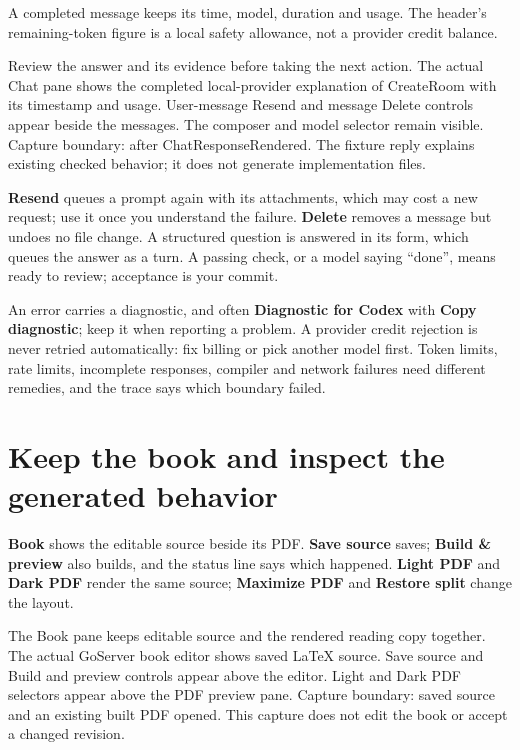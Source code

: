 A completed message keeps its time, model, duration and usage. The header's
remaining-token figure is a local safety allowance, not a provider credit balance.

  {Review the answer and its evidence before taking the next action.}
  {The actual Chat pane shows the completed local-provider explanation of CreateRoom with its timestamp and usage. User-message Resend and message Delete controls appear beside the messages. The composer and model selector remain visible.}
  {Capture boundary: after ChatResponseRendered. The fixture reply explains existing checked behavior; it does not generate implementation files.}

\textbf{Resend} queues a prompt again with its attachments, which may cost a new
request; use it once you understand the failure. \textbf{Delete} removes a message
but undoes no file change. A structured question is answered in its form, which
queues the answer as a turn. A passing check, or a model saying ``done'', means
ready to review; acceptance is your commit.

An error carries a diagnostic, and often \textbf{Diagnostic for Codex} with
\textbf{Copy diagnostic}; keep it when reporting a problem. A provider credit
rejection is never retried automatically: fix billing or pick another model first.
Token limits, rate limits, incomplete responses, compiler and network failures
need different remedies, and the trace says which boundary failed.

\section{Keep the book and inspect the generated behavior}

\textbf{Book} shows the editable source beside its PDF. \textbf{Save source}
saves; \textbf{Build \& preview} also builds, and the status line says which
happened. \textbf{Light PDF} and \textbf{Dark PDF} render the same source;
\textbf{Maximize PDF} and \textbf{Restore split} change the layout.

  {The Book pane keeps editable source and the rendered reading copy together.}
  {The actual GoServer book editor shows saved LaTeX source. Save source and Build and preview controls appear above the editor. Light and Dark PDF selectors appear above the PDF preview pane.}
  {Capture boundary: saved source and an existing built PDF opened. This capture does not edit the book or accept a changed revision.}

